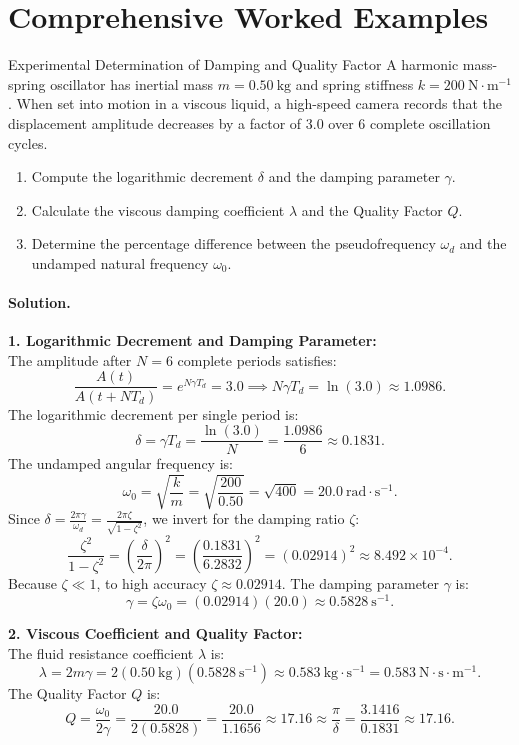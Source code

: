 \section{Comprehensive Worked Examples}

\begin{workedexample}{Experimental Determination of Damping and Quality Factor}
A harmonic mass-spring oscillator has inertial mass $m = 0.50\ \mathrm{kg}$ and spring stiffness $k = 200\ \mathrm{N\cdot m^{-1}}$. When set into motion in a viscous liquid, a high-speed camera records that the displacement amplitude decreases by a factor of $3.0$ over $6$ complete oscillation cycles.
\begin{enumerate}[leftmargin=1.4em,itemsep=3pt]
  \item Compute the logarithmic decrement $\delta$ and the damping parameter $\gamma$.
  \item Calculate the viscous damping coefficient $\lambda$ and the Quality Factor $Q$.
  \item Determine the percentage difference between the pseudofrequency $\omega_d$ and the undamped natural frequency $\omega_0$.
\end{enumerate}

\paragraph{Solution.}
\textbf{1. Logarithmic Decrement and Damping Parameter:}\\
The amplitude after $N = 6$ complete periods satisfies:
\[
\frac{A(t)}{A(t + N T_d)} = e^{N \gamma T_d} = 3.0 \implies N \gamma T_d = \ln(3.0) \approx 1.0986.
\]
The logarithmic decrement per single period is:
\[
\delta = \gamma T_d = \frac{\ln(3.0)}{N} = \frac{1.0986}{6} \approx 0.1831.
\]
The undamped angular frequency is:
\[
\omega_0 = \sqrt{\frac{k}{m}} = \sqrt{\frac{200}{0.50}} = \sqrt{400} = 20.0\ \mathrm{rad\cdot s^{-1}}.
\]
Since $\delta = \frac{2\pi \gamma}{\omega_d} = \frac{2\pi \zeta}{\sqrt{1 - \zeta^2}}$, we invert for the damping ratio $\zeta$:
\[
\frac{\zeta^2}{1 - \zeta^2} = \left(\frac{\delta}{2\pi}\right)^2 = \left(\frac{0.1831}{6.2832}\right)^2 = (0.02914)^2 \approx 8.492\times 10^{-4}.
\]
Because $\zeta \ll 1$, to high accuracy $\zeta \approx 0.02914$.
The damping parameter $\gamma$ is:
\[
\gamma = \zeta \omega_0 = (0.02914)(20.0) \approx 0.5828\ \mathrm{s^{-1}}.
\]

\textbf{2. Viscous Coefficient and Quality Factor:}\\
The fluid resistance coefficient $\lambda$ is:
\[
\lambda = 2m\gamma = 2(0.50\ \mathrm{kg})(0.5828\ \mathrm{s^{-1}}) \approx 0.583\ \mathrm{kg\cdot s^{-1}} = 0.583\ \mathrm{N\cdot s\cdot m^{-1}}.
\]
The Quality Factor $Q$ is:
\[
Q = \frac{\omega_0}{2\gamma} = \frac{20.0}{2(0.5828)} = \frac{20.0}{1.1656} \approx 17.16 \approx \frac{\pi}{\delta} = \frac{3.1416}{0.1831} \approx 17.16.
\]


\end{workedexample}
